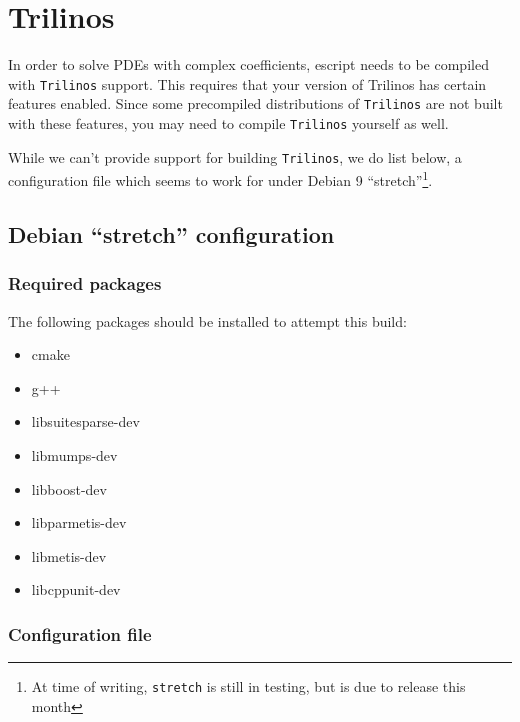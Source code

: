 \chapter{Trilinos}
\label{app:trilinos}

In order to solve PDEs with complex coefficients, escript needs to be compiled with \texttt{Trilinos} support.
This requires that your version of Trilinos has certain features enabled.
Since some precompiled distributions of \texttt{Trilinos} are not built with these features, you may 
need to compile \texttt{Trilinos} yourself as well.

While we can't provide support for building \texttt{Trilinos}, we do list below, a configuration file which seems to work for 
under Debian 9 ``stretch''\footnote{At time of writing, \texttt{stretch} is still in testing, but is due to release this month}.

\section{Debian ``stretch'' configuration}


\subsection{Required packages}

The following packages should be installed to attempt this build:
\begin{itemize}
\item[] cmake
\item[] g++
\item[] libsuitesparse-dev
\item[] libmumps-dev
\item[] libboost-dev
\item[] libparmetis-dev
\item[] libmetis-dev
\item[] libcppunit-dev
\end{itemize}



\subsection{Configuration file}

